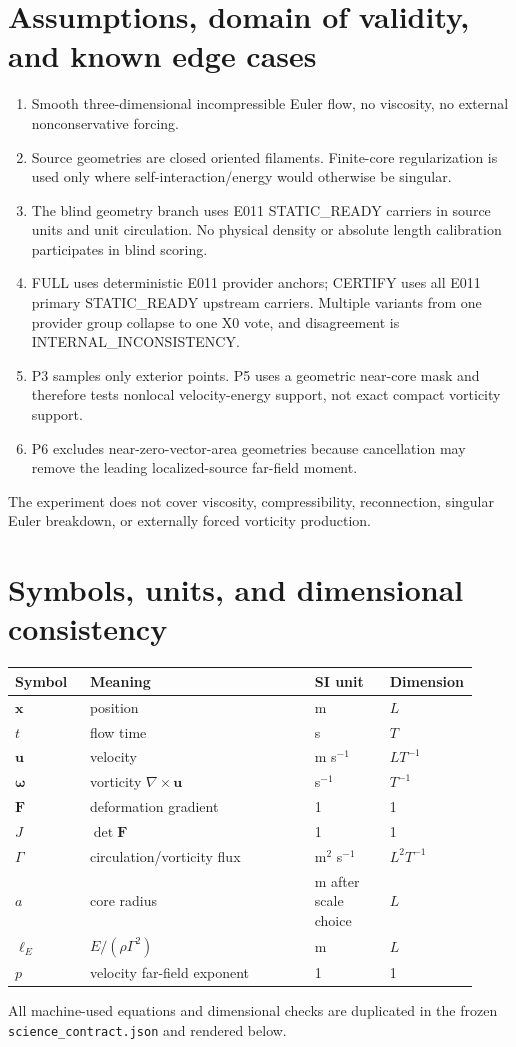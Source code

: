 \documentclass[11pt,a4paper]{article}
\newcommand{\vort}{\boldsymbol{\omega}}
\newcommand{\vel}{\mathbf{u}}
\newcommand{\Fmat}{\mathbf{F}}
\begin{document}
\section{Assumptions, domain of validity, and known edge cases}
\begin{enumerate}[label=A\arabic*.]
\item Smooth three-dimensional incompressible Euler flow, no viscosity, no external nonconservative forcing.
\item Source geometries are closed oriented filaments. Finite-core regularization is used only where self-interaction/energy would otherwise be singular.
\item The blind geometry branch uses E011 STATIC\_READY carriers in source units and unit circulation. No physical density or absolute length calibration participates in blind scoring.
\item FULL uses deterministic E011 provider anchors; CERTIFY uses all E011 primary STATIC\_READY upstream carriers. Multiple variants from one provider group collapse to one X0 vote, and disagreement is INTERNAL\_INCONSISTENCY.
\item P3 samples only exterior points. P5 uses a geometric near-core mask and therefore tests nonlocal velocity-energy support, not exact compact vorticity support.
\item P6 excludes near-zero-vector-area geometries because cancellation may remove the leading localized-source far-field moment.
\end{enumerate}
The experiment does not cover viscosity, compressibility, reconnection, singular Euler breakdown, or externally forced vorticity production.

\section{Symbols, units, and dimensional consistency}
\begin{longtable}{p{0.16\linewidth}p{0.48\linewidth}p{0.16\linewidth}p{0.12\linewidth}}
\toprule
Symbol & Meaning & SI unit & Dimension \\
\midrule
$\mathbf{x}$ & position & m & $L$ \\
$t$ & flow time & s & $T$ \\
$\vel$ & velocity & m s$^{-1}$ & $LT^{-1}$ \\
$\vort$ & vorticity $\nabla\times\vel$ & s$^{-1}$ & $T^{-1}$ \\
$\Fmat$ & deformation gradient & 1 & 1 \\
$J$ & $\det\Fmat$ & 1 & 1 \\
$\Gamma$ & circulation/vorticity flux & m$^2$ s$^{-1}$ & $L^2T^{-1}$ \\
$a$ & core radius & m after scale choice & $L$ \\
$\ell_E$ & $E/(\rho\Gamma^2)$ & m & $L$ \\
$p$ & velocity far-field exponent & 1 & 1 \\
\bottomrule
\end{longtable}
All machine-used equations and dimensional checks are duplicated in the frozen \texttt{science\_contract.json} and rendered below.
\end{document}
